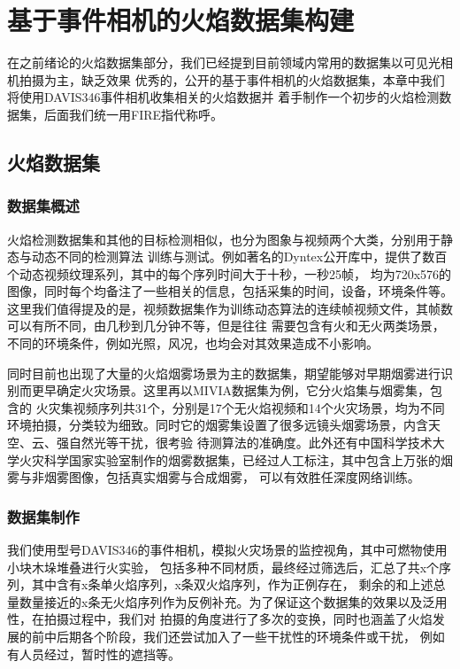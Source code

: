 
\chapter{基于事件相机的火焰数据集构建}
在之前绪论的火焰数据集部分，我们已经提到目前领域内常用的数据集以可见光相机拍摄为主，缺乏效果
优秀的，公开的基于事件相机的火焰数据集，本章中我们将使用DAVIS346事件相机收集相关的火焰数据并
着手制作一个初步的火焰检测数据集，后面我们统一用FIRE指代称呼。

\section{火焰数据集}
\subsection{数据集概述}
火焰检测数据集和其他的目标检测相似，也分为图象与视频两个大类，分别用于静态与动态不同的检测算法
训练与测试。例如著名的Dyntex公开库中，提供了数百个动态视频纹理系列，其中的每个序列时间大于十秒，一秒25帧，
均为720x576的图像，同时每个均备注了一些相关的信息，包括采集的时间，设备，环境条件等。这里我们值得提及的是，视频数据集作为训练动态算法的连续帧视频文件，其帧数可以有所不同，由几秒到几分钟不等，但是往往
需要包含有火和无火两类场景，不同的环境条件，例如光照，风况，也均会对其效果造成不小影响。

同时目前也出现了大量的火焰烟雾场景为主的数据集，期望能够对早期烟雾进行识别而更早确定火灾场景。这里再以MIVIA数据集为例，它分火焰集与烟雾集，包含的
火灾集视频序列共31个，分别是17个无火焰视频和14个火灾场景，均为不同环境拍摄，分类较为细致。同时它的烟雾集设置了很多远镜头烟雾场景，内含天空、云、强自然光等干扰，很考验
待测算法的准确度。此外还有中国科学技术大学火灾科学国家实验室制作的烟雾数据集，已经过人工标注，其中包含上万张的烟雾与非烟雾图像，包括真实烟雾与合成烟雾，
可以有效胜任深度网络训练。

\subsection{数据集制作}
我们使用型号DAVIS346的事件相机，模拟火灾场景的监控视角，其中可燃物使用小块木垛堆叠进行火实验，
包括多种不同材质，最终经过筛选后，汇总了共x个序列，其中含有x条单火焰序列，x条双火焰序列，作为正例存在，
剩余的和上述总量数量接近的x条无火焰序列作为反例补充。为了保证这个数据集的效果以及泛用性，在拍摄过程中，我们对
拍摄的角度进行了多次的变换，同时也涵盖了火焰发展的前中后期各个阶段，我们还尝试加入了一些干扰性的环境条件或干扰，
例如有人员经过，暂时性的遮挡等。

